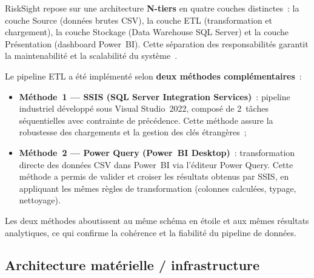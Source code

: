 \documentclass[12pt, a4paper]{report}
\begin{document}
RiskSight repose sur une architecture \textbf{N-tiers} en quatre couches distinctes~:
la couche Source (données brutes CSV), la couche ETL (transformation et chargement),
la couche Stockage (Data Warehouse SQL Server) et la couche Présentation
(dashboard Power~BI). Cette séparation des responsabilités garantit la maintenabilité
et la scalabilité du système~\cite{kimball,cdc_atlas}.

Le pipeline ETL a été implémenté selon \textbf{deux méthodes complémentaires}~:

\begin{itemize}[leftmargin=1.5em]
  \item \textbf{Méthode~1 --- SSIS (SQL Server Integration Services)}~: pipeline
    industriel développé sous Visual Studio~2022, composé de 2~tâches séquentielles
    avec contrainte de précédence. Cette méthode assure la robustesse des chargements
    et la gestion des clés étrangères~;
  \item \textbf{Méthode~2 --- Power Query (Power~BI Desktop)}~: transformation
    directe des données CSV dans Power~BI via l'éditeur Power Query. Cette méthode
    a permis de valider et croiser les résultats obtenus par SSIS, en appliquant
    les mêmes règles de transformation (colonnes calculées, typage, nettoyage).
\end{itemize}

Les deux méthodes aboutissent au même schéma en étoile et aux mêmes résultats
analytiques, ce qui confirme la cohérence et la fiabilité du pipeline de données.

\subsection{Architecture matérielle / infrastructure}
\end{document}
